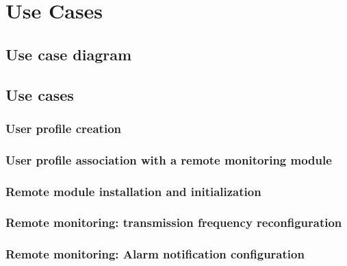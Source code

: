 \chapter{Use Cases}
\label{use-cases}

\section{Use case diagram}

\begin{figure}
	\begin{centering}
		\label{use-case-diagram}
	\end{centering}
\end{figure}

\section{Use cases}

\subsection{User profile creation}
\label{uc-user-profile-creation}


\subsection{User profile association with a remote monitoring module}
\label{uc-user-profile-association}


\subsection{Remote module installation and initialization}
\label{uc-remote-module-installation}


\subsection{Remote monitoring: transmission frequency reconfiguration}
\label{uc-remote-monitoring-frequency-reconfiguration}


\subsection{Remote monitoring: Alarm notification configuration}
\label{uc-remote-monitoring-notification-config}


